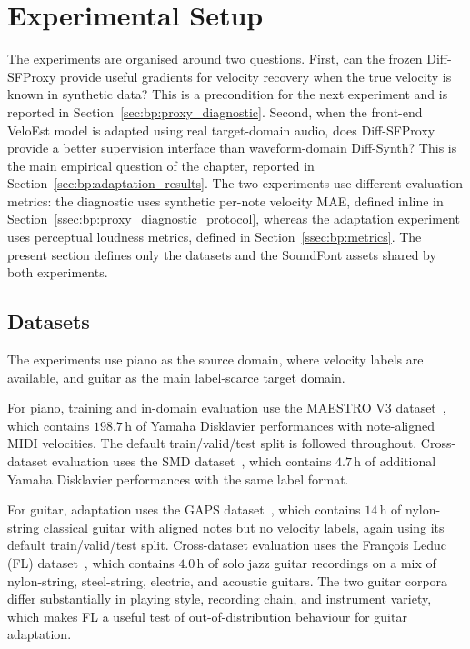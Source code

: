 \section{Experimental Setup}
\label{sec:bp:experiments}

The experiments are organised around two questions. First, can the frozen Diff-SFProxy provide useful gradients for velocity recovery when the true velocity is known in synthetic data? This is a precondition for the next experiment and is reported in Section~\ref{sec:bp:proxy_diagnostic}. Second, when the front-end VeloEst model is adapted using real target-domain audio, does Diff-SFProxy provide a better supervision interface than waveform-domain Diff-Synth? This is the main empirical question of the chapter, reported in Section~\ref{sec:bp:adaptation_results}. The two experiments use different evaluation metrics: the diagnostic uses synthetic per-note velocity MAE, defined inline in Section~\ref{ssec:bp:proxy_diagnostic_protocol}, whereas the adaptation experiment uses perceptual loudness metrics, defined in Section~\ref{ssec:bp:metrics}. The present section defines only the datasets and the SoundFont assets shared by both experiments.

\subsection{Datasets}
\label{ssec:bp:datasets}

The experiments use piano as the source domain, where velocity labels are available, and guitar as the main label-scarce target domain.

For piano, training and in-domain evaluation use the MAESTRO V3 dataset~\cite{hawthorne2019maestro}, which contains $198.7$\,h of Yamaha Disklavier performances with note-aligned MIDI velocities. The default train/valid/test split is followed throughout. Cross-dataset evaluation uses the SMD dataset~\cite{smd}, which contains $4.7$\,h of additional Yamaha Disklavier performances with the same label format.

For guitar, adaptation uses the GAPS dataset~\cite{riley2024gaps}, which contains $14$\,h of nylon-string classical guitar with aligned notes but no velocity labels, again using its default train/valid/test split. Cross-dataset evaluation uses the Fran\c{c}ois Leduc (FL) dataset~\cite{riley2024high}, which contains $4.0$\,h of solo jazz guitar recordings on a mix of nylon-string, steel-string, electric, and acoustic guitars. The two guitar corpora differ substantially in playing style, recording chain, and instrument variety, which makes FL a useful test of out-of-distribution behaviour for guitar adaptation.

